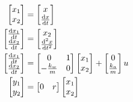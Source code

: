 \begin{align*}
\displaystyle\begin{bmatrix}
    x_1\\
    x_2
\end{bmatrix} &= 
\begin{bmatrix}
    x\\
    \frac{\diff x}{\diff t}
\end{bmatrix}
\\
\displaystyle\begin{bmatrix}
    \frac{\diff x_1}{\diff t}\\
    \frac{\diff x_2}{\diff t}
\end{bmatrix} &= 
\begin{bmatrix}
    x_2\\
    \frac{\diff^2 x}{\diff t^2}
\end{bmatrix}
\\
\displaystyle\begin{bmatrix}
    \frac{\diff x_1}{\diff t}\\
    \frac{\diff x_2}{\diff t}
\end{bmatrix} &= 
\begin{bmatrix}
    0 & 1 \\
    -\frac{k_w}{m} & 0
\end{bmatrix}
\begin{bmatrix}
    x_1\\
    x_2
\end{bmatrix} + 
\begin{bmatrix}
    0\\
    \frac{k_a}{m}
\end{bmatrix} u
\\
\displaystyle\begin{bmatrix}
    y_1 \\
    y_2
\end{bmatrix} &=
\begin{bmatrix}
    0 & r
\end{bmatrix}
\begin{bmatrix}
    x_1\\
    x_2
\end{bmatrix}
\end{align*}

